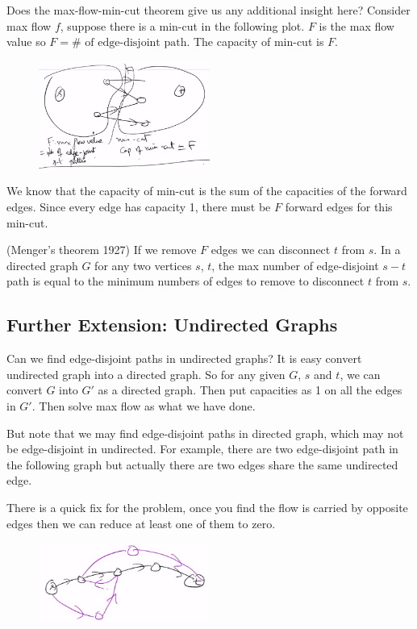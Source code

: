 Does the max-flow-min-cut theorem give us any additional insight here? Consider
max flow $f$, suppose there is a min-cut in the following plot. $F$ is the max flow value so $F = \#\text{ of edge-disjoint path}$. The capacity of min-cut is $F$.

\begin{figure}[H]
	\centering
	\includegraphics[width=0.5\textwidth]{fig/min-cut-eg.png}
\end{figure}

We know that the capacity of min-cut is the sum of the capacities of the forward edges. Since every edge has capacity 1, there must be $F$ forward edges for this min-cut.
 
\begin{theorem}
	(Menger's theorem 1927) If we remove $F$ edges we can disconnect $t$ from $s$. In a directed graph $G$ for any two vertices $s$, $t$, the max number of edge-disjoint $s-t$ path is equal to the minimum numbers of edges to remove to disconnect $t$ from $s$. 
\end{theorem}

\subsection{Further Extension: Undirected Graphs}
Can we find edge-disjoint paths in undirected graphs? It is easy convert undirected graph into a directed graph. So for any given $G$, $s$ and $t$, we can convert $G$ into $G'$ as a directed graph. Then put capacities as 1 on all the edges in $G'$. Then solve max flow as what we have done. 

But note that we may find edge-disjoint paths in directed graph, which may not be edge-disjoint in undirected. For example, there are two edge-disjoint path in the following graph but actually there are two edges share the same undirected edge. 

There is a quick fix for the problem, once you find the flow is carried by opposite edges then we can reduce at least one of them to zero. 
\begin{figure}[H]
	\centering
	\includegraphics[width=0.5\textwidth]{fig/counter-example.png}
\end{figure}


